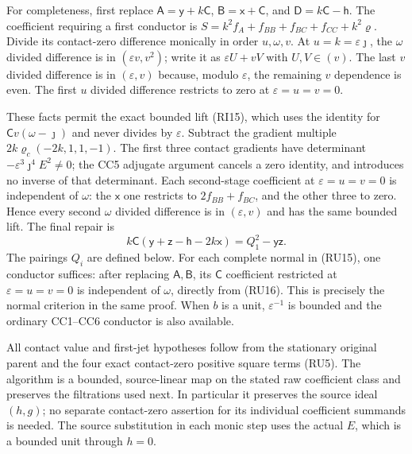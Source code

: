 For completeness, first replace $\mathsf A=\mathsf y+k\mathsf C$,
$\mathsf B=\mathsf x+\mathsf C$, and
$\mathsf D=k\mathsf C-\mathsf h$. The coefficient requiring a
first conductor is $S=k^2f_A+f_{BB}+f_{BC}+f_{CC}+k^2\varrho$.
Divide its contact-zero difference monically in order $u,\omega,v$.
At $u=k=\varepsilon\jmath$, the $\omega$ divided difference is in
$(\varepsilon v,v^2)$; write it as $\varepsilon U+vV$ with
$U,V\in(v)$. The last $v$ divided difference is in
$(\varepsilon,v)$ because, modulo $\varepsilon$, the remaining
$v$ dependence is even. The first $u$ divided difference restricts
to zero at $\varepsilon=u=v=0$.

These facts permit the exact bounded lift (RI15), which uses the
identity for $\mathsf Cv(\omega-\jmath)$ and never divides by
$\varepsilon$. Subtract the gradient multiple
$2k\varrho_c(-2k,1,1,-1)$. The first three contact gradients have
determinant $-\varepsilon^3\jmath^4E^2\ne0$; the CC5 adjugate
argument cancels a zero identity, and introduces no inverse of that
determinant. Each second-stage coefficient at
$\varepsilon=u=v=0$ is independent of $\omega$: the $\mathsf x$
one restricts to $2f_{BB}+f_{BC}$, and the other three to zero.
Hence every second $\omega$ divided difference is in
$(\varepsilon,v)$ and has the same bounded lift. The final repair is
\[
 k\mathsf C(\mathsf y+\mathsf z-\mathsf h-2k\mathsf x)
      =Q_1^2-\mathsf y\mathsf z.
 \tag{RU17}
\]
The pairings $Q_i$ are defined below. For each complete normal in
(RU15), one conductor suffices: after replacing $\mathsf A,\mathsf B$,
its $\mathsf C$ coefficient restricted at
$\varepsilon=u=v=0$ is independent of $\omega$, directly from
(RU16). This is precisely the normal criterion in the same proof.
When $b$ is a unit, $\varepsilon^{-1}$ is bounded and the ordinary
CC1--CC6 conductor is also available.

All contact value and first-jet hypotheses follow from the stationary
original parent and the four exact contact-zero positive square terms (RU5).
The algorithm is a bounded, source-linear map on the stated raw
coefficient class and preserves the filtrations used next. In
particular it preserves the source ideal $(h,g)$; no separate
contact-zero assertion for its individual coefficient summands is
needed. The source substitution in each monic step uses the actual
$E$, which is a bounded unit through $h=0$.

